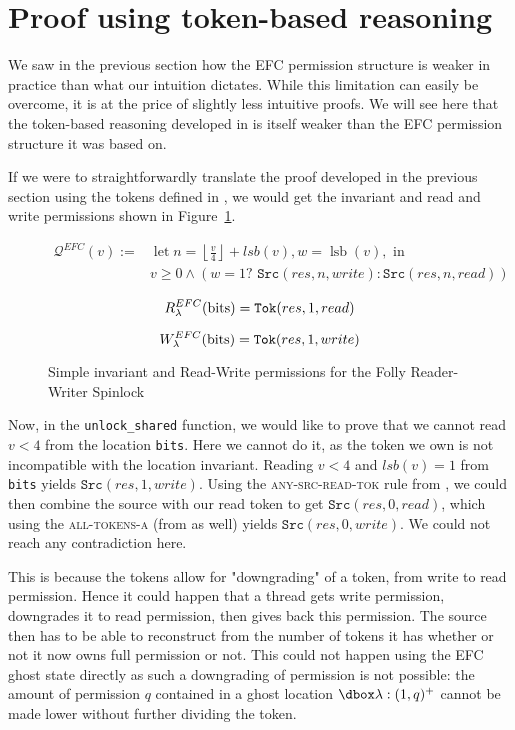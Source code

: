 \section{Proof using token-based reasoning}
We saw in the previous section how the EFC permission structure is weaker in practice than what our intuition dictates. While this limitation can easily be overcome, it is at the price of slightly less intuitive proofs. We will see here that the token-based reasoning developed in \cite{pascal} is itself weaker than the EFC permission structure it was based on.

If we were to straightforwardly translate the proof developed in the previous section using the tokens defined in \cite{pascal}, we would get the invariant and read and write permissions shown in Figure~\ref{fig:invToksRWFolly}.

\begin{figure}
$$\begin{aligned} \mathcal{Q}^{EFC}(v) :=& \operatorname{let} n=\left\lfloor\frac{v}{4}\right\rfloor + lsb(v), w=\operatorname{lsb}(v), \text { in } \\ & v \geq 0 \wedge (w = 1 ? \texttt{ Src}(res, n, write) : \texttt{Src}(res, n, read))
\end{aligned} $$

$$R_{\lambda}^{EFC}(\text{bits}) = \texttt{Tok}(res, 1, read)$$

$$W_{\lambda}^{EFC}(\text{bits}) = \texttt{Tok}(res, 1, write)$$
		\caption{Simple invariant and Read-Write permissions for the Folly Reader-Writer Spinlock}
		\label{fig:invToksRWFolly}
\end{figure}

Now, in the \texttt{unlock\_shared} function, we would like to prove that we cannot read $v < 4$ from the location \texttt{bits}. Here we cannot do it, as the token we own is not incompatible with the location invariant. Reading $v < 4$ and $lsb(v) = 1$ from \texttt{bits} yields $\texttt{Src}(res, 1, write)$. Using the \textsc{any-src-read-tok} rule from \cite{pascal}, we could then combine the source with our read token to get $\texttt{Src}(res, 0, read)$, which using the \textsc{all-tokens-a} (from \cite{pascal} as well) yields $\texttt{Src}(res, 0, write)$. We could not reach any contradiction here.

This is because the tokens allow for "downgrading" of a token, from write to read permission. Hence it could happen that a thread gets write permission, downgrades it to read permission, then gives back this permission. The source then has to be able to reconstruct from the number of tokens it has whether or not it now owns full permission or not. This could not happen using the EFC ghost state directly as such a downgrading of permission is not possible: the amount of permission $q$ contained in a ghost location $\ghost{\lambda : (1, q)^+}$ cannot be made lower without further dividing the token.

